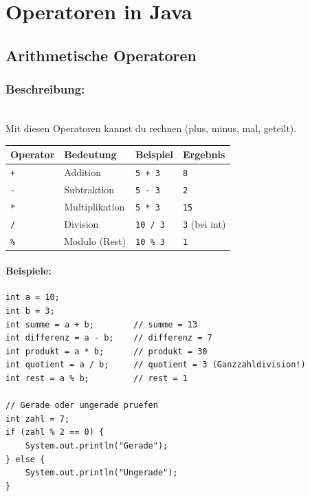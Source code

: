 \begingroup
\let\cleardoublepage\relax


\chapter*{Operatoren in Java}
\label{ch:operatoren-in-java}
\endgroup


\section*{Arithmetische Operatoren}

\subsection*{Beschreibung:}\\
Mit diesen Operatoren kannst du rechnen (plus, minus, mal, geteilt).

\begin{center}
	\begin{tabular}{|l|l|l|l|}
		\hline
		\textbf{Operator} & \textbf{Bedeutung} & \textbf{Beispiel} & \textbf{Ergebnis} \\
		\hline
		\texttt{+} & Addition & \texttt{5 + 3} & \texttt{8} \\
		\hline
		\texttt{-} & Subtraktion & \texttt{5 - 3} & \texttt{2} \\
		\hline
		\texttt{*} & Multiplikation & \texttt{5 * 3} & \texttt{15} \\
		\hline
		\texttt{/} & Division & \texttt{10 / 3} & \texttt{3} (bei int) \\
		\hline
		\texttt{\%} & Modulo (Rest) & \texttt{10 \% 3} & \texttt{1} \\
		\hline
	\end{tabular}
\end{center}

\subsubsection*{Beispiele:}
\begin{lstlisting}
int a = 10;
int b = 3;
int summe = a + b;        // summe = 13
int differenz = a - b;    // differenz = 7
int produkt = a * b;      // produkt = 30
int quotient = a / b;     // quotient = 3 (Ganzzahldivision!)
int rest = a % b;         // rest = 1

// Gerade oder ungerade pruefen
int zahl = 7;
if (zahl % 2 == 0) {
    System.out.println("Gerade");
} else {
    System.out.println("Ungerade");
}
\end{lstlisting}

